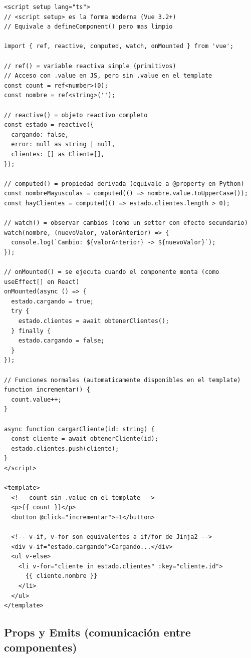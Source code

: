 \documentclass[11pt,a4paper]{article}
\begin{document}
\begin{vuebox}
\begin{lstlisting}[style=typescript]
<script setup lang="ts">
// <script setup> es la forma moderna (Vue 3.2+)
// Equivale a defineComponent() pero mas limpio

import { ref, reactive, computed, watch, onMounted } from 'vue';

// ref() = variable reactiva simple (primitivos)
// Acceso con .value en JS, pero sin .value en el template
const count = ref<number>(0);
const nombre = ref<string>('');

// reactive() = objeto reactivo completo
const estado = reactive({
  cargando: false,
  error: null as string | null,
  clientes: [] as Cliente[],
});

// computed() = propiedad derivada (equivale a @property en Python)
const nombreMayusculas = computed(() => nombre.value.toUpperCase());
const hayClientes = computed(() => estado.clientes.length > 0);

// watch() = observar cambios (como un setter con efecto secundario)
watch(nombre, (nuevoValor, valorAnterior) => {
  console.log(`Cambio: ${valorAnterior} -> ${nuevoValor}`);
});

// onMounted() = se ejecuta cuando el componente monta (como useEffect[] en React)
onMounted(async () => {
  estado.cargando = true;
  try {
    estado.clientes = await obtenerClientes();
  } finally {
    estado.cargando = false;
  }
});

// Funciones normales (automaticamente disponibles en el template)
function incrementar() {
  count.value++;
}

async function cargarCliente(id: string) {
  const cliente = await obtenerCliente(id);
  estado.clientes.push(cliente);
}
</script>

<template>
  <!-- count sin .value en el template -->
  <p>{{ count }}</p>
  <button @click="incrementar">+1</button>

  <!-- v-if, v-for son equivalentes a if/for de Jinja2 -->
  <div v-if="estado.cargando">Cargando...</div>
  <ul v-else>
    <li v-for="cliente in estado.clientes" :key="cliente.id">
      {{ cliente.nombre }}
    </li>
  </ul>
</template>
\end{lstlisting}
\end{vuebox}

\subsection{Props y Emits (comunicación entre componentes)}
\end{document}
